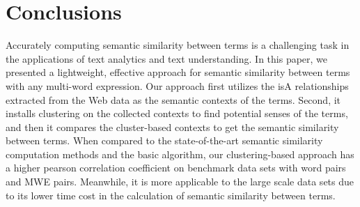 \section{Conclusions}
\label{sec:conclude}

Accurately computing semantic similarity between terms is 
a challenging task in the applications of text analytics and 
text understanding.  In this paper, we
presented a lightweight, effective approach for semantic similarity 
between terms with any multi-word expression. 
Our approach first utilizes the isA relationships extracted 
from the Web data as the semantic contexts of the terms. 
Second, it installs clustering on the collected contexts 
to find potential senses of the terms, and then it compares 
the cluster-based contexts to get the semantic similarity between terms. 
When compared to the state-of-the-art semantic similarity computation
methods and the basic algorithm, 
our clustering-based approach has a higher pearson 
correlation coefficient on benchmark data sets with word pairs 
and MWE pairs. Meanwhile, it is more applicable to the 
large scale data sets due to its lower time cost in the 
calculation of semantic similarity between terms.

